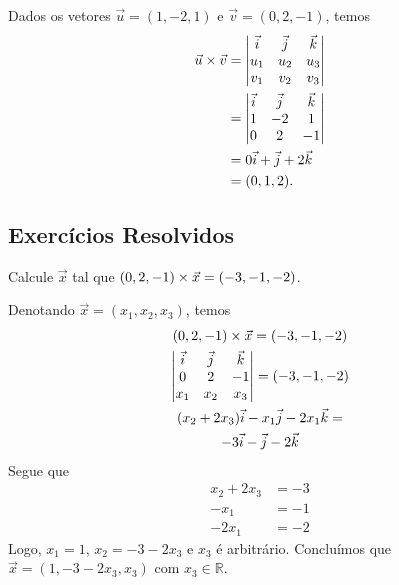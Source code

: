 \begin{ex}
  Dados os vetores $\vec{u} = (1,-2,1)$ e $\vec{v} = (0,2,-1)$, temos
  \begin{align}
    \vec{u}\times\vec{v} &=
                          \begin{vmatrix}
                            \vec{i} & \vec{j} & \vec{k} \\
                            u_1 & u_2 & u_3 \\
                            v_1 & v_2 & v_3
                          \end{vmatrix} \\
                        &=
                          \begin{vmatrix}
                            \vec{i} & \vec{j} & \vec{k} \\
                            1       & -2      & 1 \\
                            0       & 2       & -1
                          \end{vmatrix} \\
                        &= 0\vec{i} + \vec{j} + 2\vec{k}\\
                        &= (0,1,2).
  \end{align}
\end{ex}

\subsection{Exercícios Resolvidos}

\begin{exeresol}
  Calcule $\vec{x}$ tal que $(0,2,-1)\times\vec{x}=(-3,-1,-2)$.
\end{exeresol}
\begin{resol}
  Denotando $\vec{x}=(x_1,x_2,x_3)$, temos
  \begin{gather}
    (0,2,-1)\times\vec{x}=(-3,-1,-2)\\
    \begin{vmatrix}
      \vec{i} & \vec{j} & \vec{k} \\
      0 & 2 & -1 \\
      x_1 & x_2 & x_3
    \end{vmatrix} = (-3,-1,-2)\\
    (x_2+2x_3)\vec{i}-x_1\vec{j}-2x_1\vec{k} = \\
    -3\vec{i}-\vec{j}-2\vec{k}
  \end{gather}
  Segue que
  \begin{align*}
    x_2+2x_3 &= -3\\
    -x_1 &= -1\\
    -2x_1 &= -2
  \end{align*}
  Logo, $x_1 = 1$, $x_2=-3-2x_3$ e $x_3$ é arbitrário. Concluímos que $\vec{x} = (1,-3-2x_3,x_3)$ com $x_3\in\mathbb{R}$.
\end{resol}

